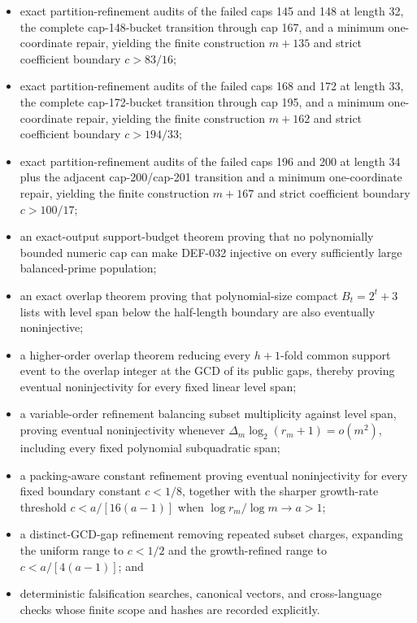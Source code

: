 \documentclass[11pt]{article}
\begin{document}
\begin{itemize}
  the complete cap-127-bucket transition through cap 144, and a minimum
  one-coordinate repair, yielding the finite construction \(m+113\) and
  strict coefficient boundary \(c>143/31\);
\item exact partition-refinement audits of the failed caps 145 and 148 at
  length 32, the complete cap-148-bucket transition through cap 167, and a
  minimum one-coordinate repair, yielding the finite construction \(m+135\)
  and strict coefficient boundary \(c>83/16\);
\item exact partition-refinement audits of the failed caps 168 and 172 at
  length 33, the complete cap-172-bucket transition through cap 195, and a
  minimum one-coordinate repair, yielding the finite construction \(m+162\)
  and strict coefficient boundary \(c>194/33\);
\item exact partition-refinement audits of the failed caps 196 and 200 at
  length 34 plus the adjacent cap-200/cap-201 transition and a minimum
  one-coordinate repair, yielding the finite construction \(m+167\) and
  strict coefficient boundary \(c>100/17\);
\item an exact-output support-budget theorem proving that no polynomially
  bounded numeric cap can make DEF-032 injective on every sufficiently large
  balanced-prime population;
\item an exact overlap theorem proving that polynomial-size compact
  \(B_t=2^t+3\) lists with level span below the half-length boundary are also
  eventually noninjective;
\item a higher-order overlap theorem reducing every \(h+1\)-fold common
  support event to the overlap integer at the GCD of its public gaps, thereby
  proving eventual noninjectivity for every fixed linear level span;
\item a variable-order refinement balancing subset multiplicity against
  level span, proving eventual noninjectivity whenever
  \(\Delta_m\log_2(r_m+1)=o(m^2)\), including every fixed polynomial
  subquadratic span;
\item a packing-aware constant refinement proving eventual noninjectivity
  for every fixed boundary constant \(c<1/8\), together with the sharper
  growth-rate threshold \(c<a/[16(a-1)]\) when
  \(\log r_m/\log m\to a>1\);
\item a distinct-GCD-gap refinement removing repeated subset charges,
  expanding the uniform range to \(c<1/2\) and the growth-refined range to
  \(c<a/[4(a-1)]\); and
\item deterministic falsification searches, canonical vectors, and
  cross-language checks whose finite scope and hashes are recorded explicitly.
\end{itemize}
\end{document}
